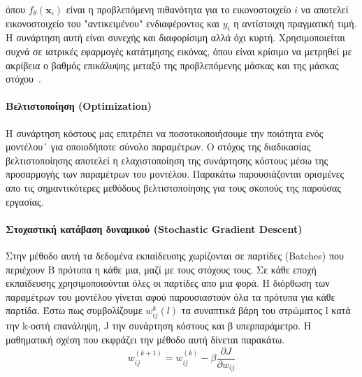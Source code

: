 \documentclass[12pt]{article}
\numberwithin{equation}{section}
\begin{document}
\noindent όπου $f_\theta(\mathbf{x}_i)$ είναι η προβλεπόμενη πιθανότητα για το εικονοστοιχείο $i$ να αποτελεί εικονοστοιχείο του "αντικειμένου" ενδιαφέροντος και $y_i$ η αντίστοιχη πραγματική τιμή.\\

\noindent Η συνάρτηση αυτή είναι συνεχής και διαφορίσιμη αλλά όχι κυρτή. Χρησιμοποιείται συχνά σε ιατρικές εφαρμογές κατάτμησης εικόνας, όπου είναι κρίσιμο να μετρηθεί με ακρίβεια ο βαθμός επικάλυψης μεταξύ της προβλεπόμενης μάσκας και της μάσκας στόχου~\cite{ciampiconi2024surveytaxonomylossfunctions}.\\

\paragraph{Βελτιστοποίηση (Optimization)\\ [0.5 cm]}

Η συνάρτηση κόστους μας επιτρέπει να ποσοτικοποιήσουμε την ποιότητα ενός μοντέλου´ για οποιοδήποτε σύνολο παραμέτρων. Ο στόχος της διαδικασίας βελτιστοποίησης αποτελεί η ελαχιστοποίηση της συνάρτησης κόστους μέσω της προσαρμογής των παραμέτρων του μοντέλου. Παρακάτω παρουσιάζονται ορισμένες απο τις σημαντικότερες μεθόδους βελτιστοποίησης για τους σκοπούς της παρούσας εργασίας. \\

\paragraph{Στοχαστική κατάβαση δυναμικού (Stochastic Gradient Descent)\\ [0.5 cm]}

Στην μέθοδο αυτή τα δεδομένα εκπαίδευσης χωρίζονται σε παρτίδες (Batches) που περιέχουν B πρότυπα η κάθε μια, μαζί με τους στόχους τους. Σε κάθε εποχή εκπαίδευσης χρησιμοποιούνται όλες οι παρτίδες απο μια φορά. Η διόρθωση των παραμέτρων του μοντέλου γίνεται αφού παρουσιαστούν όλα τα πρότυπα για κάθε παρτίδα. Έστω πως συμβολίζουμε \(w_{ij}^k(l)\) τα συναπτικά βάρη του στρώματος l κατά την k-οστή επανάληψη, J την συνάρτηση κόστους και β υπερπαράμετρο. Η μαθηματική σχέση που εκφράζει την μέθοδο αυτή δίνεται παρακάτω.\\

\begin{equation}
w_{ij}^{(k+1)} = w_{ij}^{(k)} - \beta \frac{\partial J}{\partial w_{ij}}
\end{equation}\\
\end{document}

